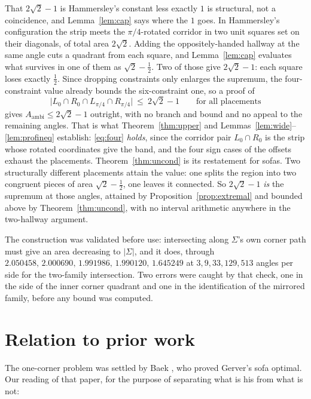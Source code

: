 \documentclass[11pt]{article}
\theoremstyle{definition}
\newcommand{\Sig}{\Sigma}
\begin{document}
That $2\sqrt2-1$ is Hammersley's constant less exactly $1$ is structural, not a
coincidence, and Lemma~\ref{lem:cap} says where the $1$ goes. In Hammersley's
configuration the strip meets the $\pi/4$-rotated corridor in two unit squares set on
their diagonals, of total area $2\sqrt2$. Adding the oppositely-handed hallway at the same
angle cuts a quadrant from each square, and Lemma~\ref{lem:cap} evaluates what survives in
one of them as $\sqrt2-\tfrac12$. Two of those give $2\sqrt2-1$: each square loses exactly
$\tfrac12$.
Since dropping constraints only enlarges the supremum, the four-constraint value already
bounds the six-constraint one, so a proof of
\begin{equation}\label{eq:four}
  \bigl|L_0\cap R_0\cap L_{\pi/4}\cap R_{\pi/4}\bigr|\ \le\ 2\sqrt2-1
  \qquad\text{for all placements}
\end{equation}
gives $A_{\mathrm{ambi}}\le2\sqrt2-1$ outright, with no branch and bound and no appeal to
the remaining angles. That is what Theorem~\ref{thm:upper} and
Lemmas~\ref{lem:wide}--\ref{lem:profineq} establish: \eqref{eq:four} \emph{holds}, since
the corridor pair $L_0\cap R_0$ is the strip whose rotated coordinates give the band, and
the four sign cases of the offsets exhaust the placements. Theorem~\ref{thm:uncond} is its
restatement for sofas. Two structurally different placements attain the value: one splits
the region into two congruent pieces of area $\sqrt2-\tfrac12$, one leaves it connected.
So $2\sqrt2-1$ \emph{is} the supremum at those angles, attained by
Proposition~\ref{prop:extremal} and bounded above by Theorem~\ref{thm:uncond}, with no
interval arithmetic anywhere in the two-hallway argument.

The construction was validated before use: intersecting along $\Sig$'s own corner path
must give an area decreasing to $|\Sig|$, and it does, through
$2.050458,\,2.000690,\,1.991986,\,1.990120,\,1.645249$ at $3,9,33,129,513$ angles per side
for the two-family intersection. Two errors were caught by that check, one in the side of
the inner corner quadrant and one in the identification of the mirrored family, before any
bound was computed.

\section{Relation to prior work}\label{sec:prior}

The one-corner problem was settled by Baek \cite{Bae24}, who proved Gerver's sofa optimal.
Our reading of that paper, for the purpose of separating what is his from what is not:
\end{document}
